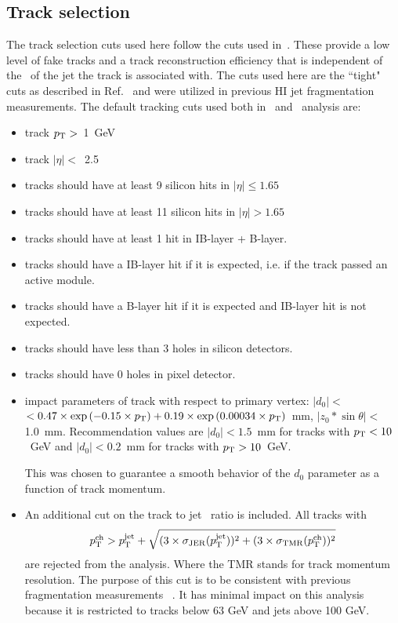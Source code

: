 \subsection{Track selection}
\label{sec:trackselection}

The track selection cuts used here follow the cuts used in~\cite{PhysRevC.98.024908}. These provide a low level of fake tracks and 
a track reconstruction efficiency that is independent of the \pt\ of the jet the track is associated with.  
The cuts used here are the ``tight" cuts as described in Ref.~\cite{ref:tracktwiki} and were utilized in previous HI jet fragmentation measurements. The default tracking cuts used both in \pp\ and \PbPb\ analysis are:
\begin{itemize}
\item{ track $\mbox{$p_{\mathrm{T}}$}>$~1~GeV}
\item{ track $|\eta|<$~2.5}
\item{ tracks should have at least 9 silicon hits in $|\eta|\leq1.65$}
\item{ tracks should have at least 11 silicon hits in $|\eta|>1.65$}
\item{ tracks should have at least 1 hit in IB-layer + B-layer.}
\item{tracks should have a IB-layer hit if it is expected, i.e. if the track passed an active module.}
\item{tracks should have a B-layer hit if it is expected and IB-layer hit is not expected.}
\item{ tracks should have  less than 3 holes in silicon detectors.}
\item{ tracks should have 0 holes in pixel detector.}
\item{impact parameters of track with respect to primary vertex:  $|d_0|<$$< 0.47\times \exp{(-0.15\times\mbox{$p_{\mathrm{T}}$})} + 0.19\times \exp{(0.00034\times\mbox{$p_{\mathrm{T}}$})}$~mm, $|z_0*\sin\theta|<$1.0~mm. Recommendation values are  $|d_0| < 1.5$~mm for tracks with $\mbox{$p_{\mathrm{T}}$}<10$~GeV and $|d_0| < 0.2$~mm for tracks with $\mbox{$p_{\mathrm{T}}$}>10$~GeV.
  	
  	This was chosen to guarantee a smooth behavior of the $d_{0}$ parameter as a function of track momentum. }
\item{ An additional cut on the track to jet \pT\ ratio is included. All tracks with 
\begin{equation}
\mbox{$p_{{\mathrm{T}}}^{\mathrm{ch}}$} >  \mbox{$p_{\mathrm{T}}^{\mathrm{jet}}$} + \sqrt{ (3 \times \sigma_{\mathrm{JER}}(\mbox{$p_{\mathrm{T}}^{\mathrm{jet}}$}))^2 + (3 \times \sigma_{\mathrm{TMR}}(\mbox{$p_{{\mathrm{T}}}^{\mathrm{ch}}$}))^2} 
\end{equation}
are rejected from the analysis. Where the TMR stands for track momentum resolution. The purpose of this cut is to be consistent with previous fragmentation measurements ~\cite{PhysRevC.98.024908}. It has minimal impact on this analysis because it is restricted to tracks below 63 GeV and jets above 100 GeV. }
\end{itemize}

